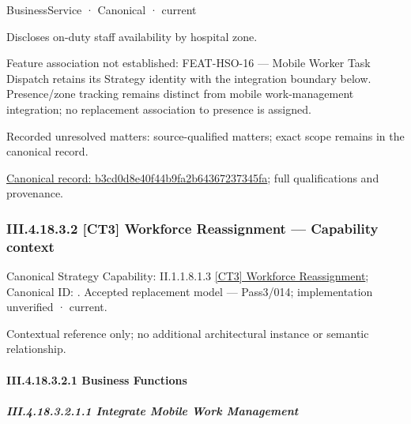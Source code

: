 \label{element:b3cd0d8e40f44b9fa2b64367237345fa}
{\small BusinessService · Canonical · current}\par

Discloses on-duty staff availability by hospital zone.



Feature association not established: FEAT-HSO-16 — Mobile Worker Task Dispatch retains its Strategy identity with the integration boundary below. Presence/zone tracking remains distinct from mobile work-management integration; no replacement association to presence is assigned.


{\small Recorded unresolved matters: source-qualified matters; exact scope remains in the canonical record.}\par
{\footnotesize \href{../../../../../../../../continuum/business/business-service/b3cd0d8e40f44b9fa2b64367237345fa.md}{Canonical record: b3cd0d8e40f44b9fa2b64367237345fa}; full qualifications and provenance.}\par
\subsubsection*{III.4.18.3.2 [CT3] Workforce Reassignment — Capability context}
\label{navigation:III.4.18.3.2}

{\small Canonical Strategy Capability: II.1.1.8.1.3 \hyperref[element:6e450d780ab54d129d5f648aa49edd2f]{[CT3] Workforce Reassignment}; Canonical ID: \texttt{}. Accepted replacement model — Pass3/014; implementation unverified · current.}\par
Contextual reference only; no additional architectural instance or semantic relationship.\par
\paragraph*{III.4.18.3.2.1 Business Functions}
\label{navigation:III.4.18.3.2.1}

\subparagraph*{III.4.18.3.2.1.1 Integrate Mobile Work Management}
\label{navigation:III.4.18.3.2.1.1}

